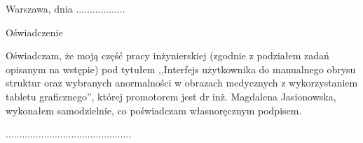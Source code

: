 \documentclass[a4paper,11pt,twoside]{report}
\theoremstyle{definition}
\newcommand{\tytul}{Interfejs użytkownika do manualnego obrysu struktur oraz wybranych anormalności w obrazach medycznych z wykorzystaniem tabletu graficznego}
\renewcommand{\title}{English title}
\newcommand{\type}{inżyniers} %
\newcommand{\supervisor}{dr inż. Magdalena Jasionowska}
\begin{document}
\sloppy





{
\begin{abstract}

\begin{center}
\tytul
\end{center}

Przykładowe streszczenie. Do wykonania jako ostatnie.

\noindent \textbf{Słowa kluczowe:} slowo1, slowo2, ...
\end{abstract}
}

\null\thispagestyle{empty}\newpage

{
\begin{abstract}

\begin{center}
\title
\end{center}

Sample abstract in english.

\noindent \textbf{Keywords:} keyword1, keyword2, ...
\end{abstract}
}




\null\thispagestyle{empty}\newpage

\null \hfill Warszawa, dnia ..................\\

\par\vspace{5cm}

\begin{center}
Oświadczenie
\end{center}

\indent Oświadczam, że moją część pracy \type kiej (zgodnie z podziałem zadań opisanym na wstępie) pod
tytułem ,,\tytul '', której promotorem jest \supervisor , wykonałem
samodzielnie, co poświadczam własnoręcznym podpisem.
\vspace{2cm}


\begin{flushright}
  \begin{minipage}{50mm}
    \begin{center}
      ..............................................

    \end{center}
  \end{minipage}
\end{flushright}
\end{document}
